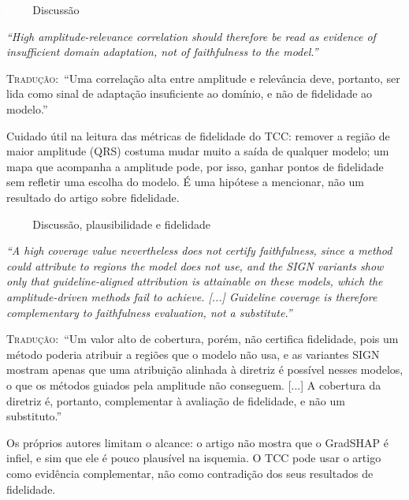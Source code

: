 \documentclass[11pt,a4paper]{article}
\newcommand{\pagechip}[1]{{\setlength{\fboxsep}{1.5pt}\colorbox{cAcc}{\textcolor{white}{\scriptsize\texttt{#1}}}}}
\newenvironment{origquote}{\par\itshape\small}{\par}
\newenvironment{tradquote}{\par\small\textsc{Tradução:}\ }{\par}
\newcommand{\explab}[1]{\par\smallskip{\small\color{cAcc}\textbf{\MakeUppercase{#1}}}\par}
\begin{document}
\begin{citacard}{\pagechip{p. 7} Discussão}
\begin{origquote}“High amplitude-relevance correlation should therefore be read as evidence of insufficient domain adaptation, not of faithfulness to the model.”\end{origquote}
\begin{tradquote}“Uma correlação alta entre amplitude e relevância deve, portanto, ser lida como sinal de adaptação insuficiente ao domínio, e não de fidelidade ao modelo.”\end{tradquote}
\explab{Explicação}
Cuidado útil na leitura das métricas de fidelidade do TCC: remover a região de maior amplitude (QRS) costuma mudar muito a saída de qualquer modelo; um mapa que acompanha a amplitude pode, por isso, ganhar pontos de fidelidade sem refletir uma escolha do modelo. É uma hipótese a mencionar, não um resultado do artigo sobre fidelidade.
\end{citacard}

\begin{citacard}{\pagechip{p. 7} Discussão, plausibilidade e fidelidade}
\begin{origquote}“A high coverage value nevertheless does not certify faithfulness, since a method could attribute to regions the model does not use, and the SIGN variants show only that guideline-aligned attribution is attainable on these models, which the amplitude-driven methods fail to achieve. [...] Guideline coverage is therefore complementary to faithfulness evaluation, not a substitute.”\end{origquote}
\begin{tradquote}“Um valor alto de cobertura, porém, não certifica fidelidade, pois um método poderia atribuir a regiões que o modelo não usa, e as variantes SIGN mostram apenas que uma atribuição alinhada à diretriz é possível nesses modelos, o que os métodos guiados pela amplitude não conseguem. [...] A cobertura da diretriz é, portanto, complementar à avaliação de fidelidade, e não um substituto.”\end{tradquote}
\explab{Explicação}
Os próprios autores limitam o alcance: o artigo não mostra que o GradSHAP é infiel, e sim que ele é pouco plausível na isquemia. O TCC pode usar o artigo como evidência complementar, não como contradição dos seus resultados de fidelidade.
\end{citacard}
\end{document}
